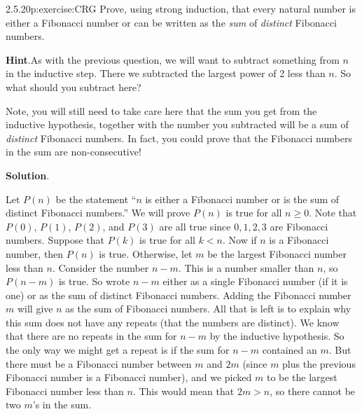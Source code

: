 \documentclass[twoside,11pt,]{book}
\newcommand{\blocktitlefont}{\relax}
\numberwithin{equation}{chapter}
\newcommand{\lt}{<}
\begin{document}
\begin{divisionsolution}{2.5.20}{}{p:exercise:CRG}%
Prove, using strong induction, that every natural number is either a Fibonacci number or can be written as the \emph{sum} of \emph{distinct} Fibonacci numbers.%
\par\smallskip%
\noindent\textbf{\blocktitlefont Hint}.\quad{}As with the previous question, we will want to subtract something from \(n\) in the inductive step.  There we subtracted the largest power of 2 less than \(n\).  So what should you subtract here?%
\par
Note, you will still need to take care here that the sum you get from the inductive hypothesis, together with the number you subtracted will be a sum of \emph{distinct} Fibonacci numbers.  In fact, you could prove that the Fibonacci numbers in the sum are non-consecutive!%
\par\smallskip%
\noindent\textbf{\blocktitlefont Solution}.\quad{}\begin{solutionproof}
Let \(P(n)\) be the statement ``\(n\) is either a Fibonacci number or is the sum of distinct Fibonacci numbers.'' We will prove \(P(n)\) is true for all \(n \ge 0\). Note that \(P(0)\), \(P(1)\), \(P(2)\), and \(P(3)\) are all true since \(0, 1, 2, 3\) are Fibonacci numbers. Suppose that \(P(k)\) is true for all \(k \lt n\). Now if \(n\) is a Fibonacci number, then \(P(n)\) is true. Otherwise, let \(m\) be the largest Fibonacci number less than \(n\). Consider the number \(n - m\). This is a number smaller than \(n\), so \(P(n-m)\) is true. So wrote \(n-m\) either as a single Fibonacci number (if it is one) or as the sum of distinct Fibonacci numbers. Adding the Fibonacci number \(m\) will give \(n\) as the sum of Fibonacci numbers. All that is left is to explain why this sum does not have any repeats (that the numbers are distinct). We know that there are no repeats in the sum for \(n-m\) by the inductive hypothesis. So the only way we might get a repeat is if the sum for \(n-m\) contained an \(m\). But there must be a Fibonacci number between \(m\) and \(2m\) (since \(m\) plus the previous Fibonacci number is a Fibonacci number), and we picked \(m\) to be the largest Fibonacci number less than \(n\). This would mean that \(2m > n\), so there cannot be two \(m\)'s in the sum.%
\end{solutionproof}
\end{divisionsolution}%
\end{document}
